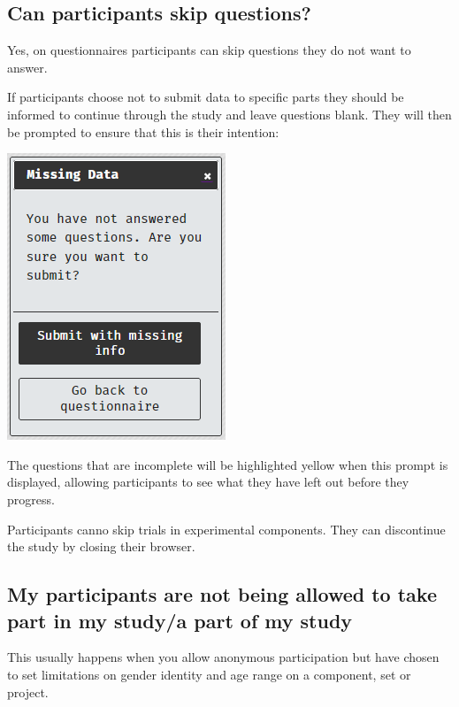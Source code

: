 \documentclass[]{book}
\begin{document}
\subsection*{Can participants skip
questions?}\label{can-participants-skip-questions}

Yes, on questionnaires participants can skip questions they do not want
to answer.

If participants choose not to submit data to specific parts they should
be informed to continue through the study and leave questions blank.
They will then be prompted to ensure that this is their intention:

\includegraphics{images/screenshots/missing.png}

The questions that are incomplete will be highlighted yellow when this
prompt is displayed, allowing participants to see what they have left
out before they progress.

Participants canno skip trials in experimental components. They can
discontinue the study by closing their browser.

\subsection*{My participants are not being allowed to take part in my
study/a part of my
study}\label{my-participants-are-not-being-allowed-to-take-part-in-my-studya-part-of-my-study}

This usually happens when you allow anonymous participation but have
chosen to set limitations on gender identity and age range on a
component, set or project.
\end{document}
